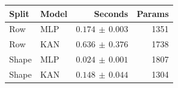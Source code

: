 \begin{center}
\small
\setlength{\tabcolsep}{4pt}
\begin{tabular}{@{}llrr@{}}
\toprule
Split & Model & Seconds & Params\\
\midrule
Row & MLP & $0.174\,\pm\,0.003$ & 1351\\
Row & KAN & $0.636\,\pm\,0.376$ & 1738\\
Shape & MLP & $0.024\,\pm\,0.001$ & 1807\\
Shape & KAN & $0.148\,\pm\,0.044$ & 1304\\
\bottomrule
\end{tabular}
\end{center}